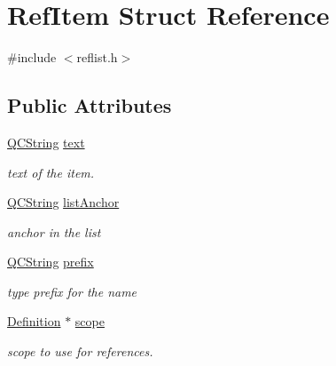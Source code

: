 \hypertarget{struct_ref_item}{}\section{Ref\+Item Struct Reference}
\label{struct_ref_item}


{\ttfamily \#include $<$reflist.\+h$>$}

\subsection*{Public Attributes}
\begin{DoxyCompactItemize}
\item 
\mbox{\label{struct_ref_item_a03313f190ccfba8be0bcfbb5dedf6c73}} 
\mbox{\hyperlink{class_q_c_string}{Q\+C\+String}} \mbox{\hyperlink{struct_ref_item_a03313f190ccfba8be0bcfbb5dedf6c73}{text}}
\begin{DoxyCompactList}\small\item\em text of the item. \end{DoxyCompactList}\item 
\mbox{\label{struct_ref_item_a06a0f029d92e3573e65f94a2a106b95f}} 
\mbox{\hyperlink{class_q_c_string}{Q\+C\+String}} \mbox{\hyperlink{struct_ref_item_a06a0f029d92e3573e65f94a2a106b95f}{list\+Anchor}}
\begin{DoxyCompactList}\small\item\em anchor in the list \end{DoxyCompactList}\item 
\mbox{\label{struct_ref_item_a5bc1b5fe84242499696ff7414217fd58}} 
\mbox{\hyperlink{class_q_c_string}{Q\+C\+String}} \mbox{\hyperlink{struct_ref_item_a5bc1b5fe84242499696ff7414217fd58}{prefix}}
\begin{DoxyCompactList}\small\item\em type prefix for the name \end{DoxyCompactList}\item 
\mbox{\label{struct_ref_item_a627583db0bcc1f4fb12b8825a5a93670}} 
\mbox{\hyperlink{class_definition}{Definition}} $\ast$ \mbox{\hyperlink{struct_ref_item_a627583db0bcc1f4fb12b8825a5a93670}{scope}}
\begin{DoxyCompactList}\small\item\em scope to use for references. \end{DoxyCompactList}\item 

\end{DoxyCompactItemize}
